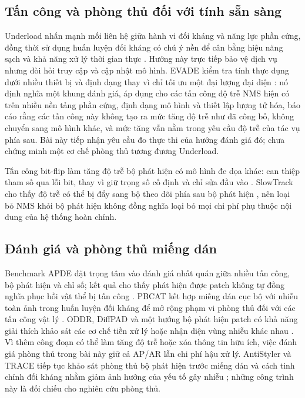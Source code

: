 \documentclass[a4paper,fleqn]{cas-dc}
\begin{document}
\subsection{Tấn công và phòng thủ đối với tính sẵn sàng}
Underload nhấn mạnh mối liên hệ giữa hành vi đối kháng và năng lực phần cứng, đồng thời sử dụng huấn luyện đối kháng có chú ý nền để cân bằng hiệu năng sạch và khả năng xử lý thời gian thực \cite{underload2025}. Hướng này trực tiếp bảo vệ dịch vụ nhưng đòi hỏi truy cập và cập nhật mô hình. EVADE kiểm tra tính thực dụng dưới nhiều thiết bị và định dạng thay vì chỉ tối ưu một đại lượng đại diện \cite{evade2025}: nó định nghĩa một khung đánh giá, áp dụng cho các tấn công độ trễ NMS hiện có trên nhiều nền tảng phần cứng, định dạng mô hình và thiết lập lượng tử hóa, báo cáo rằng các tấn công này không tạo ra mức tăng độ trễ như đã công bố, không chuyển sang mô hình khác, và mức tăng vẫn nằm trong yêu cầu độ trễ của tác vụ phía sau. Bài này tiếp nhận yêu cầu đo thực thi của hướng đánh giá đó; chưa chứng minh một cơ chế phòng thủ tương đương Underload.

Tấn công bit-flip làm tăng độ trễ bộ phát hiện có mô hình đe dọa khác: can thiệp tham số qua lỗi bit, thay vì giữ trọng số cố định và chỉ sửa đầu vào \cite{bitflip2025}. SlowTrack cho thấy độ trễ có thể bị đẩy sang bộ theo dõi phía sau bộ phát hiện \cite{slowtrack2024}, nên loại bỏ NMS khỏi bộ phát hiện không đồng nghĩa loại bỏ mọi chi phí phụ thuộc nội dung của hệ thống hoàn chỉnh.

\subsection{Đánh giá và phòng thủ miếng dán}
Benchmark APDE đặt trọng tâm vào đánh giá nhất quán giữa nhiều tấn công, bộ phát hiện và chỉ số; kết quả cho thấy phát hiện được patch không tự đồng nghĩa phục hồi vật thể bị tấn công \cite{apde2025}. PBCAT kết hợp miếng dán cục bộ với nhiễu toàn ảnh trong huấn luyện đối kháng để mở rộng phạm vi phòng thủ đối với các tấn công vật lý \cite{pbcat2025}. ODDR, DiffPAD và một hướng bộ phát hiện patch có khả năng giải thích khảo sát các cơ chế tiền xử lý hoặc nhận diện vùng nhiễu khác nhau \cite{oddr2025,diffpad2025,unifiedpatchdet2025}. Vì thêm công đoạn có thể làm tăng độ trễ hoặc xóa thông tin hữu ích, việc đánh giá phòng thủ trong bài này giữ cả AP/AR lẫn chi phí hậu xử lý. AntiStyler và TRACE tiếp tục khảo sát phòng thủ bộ phát hiện trước miếng dán và cách tinh chỉnh đối kháng nhằm giảm ảnh hưởng của yếu tố gây nhiễu \cite{antistyler2026,trace2026}; những công trình này là đối chiếu cho nghiên cứu phòng thủ.
\end{document}
